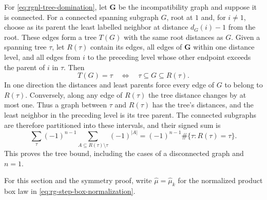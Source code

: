 \documentclass[11pt,letterpaper,reqno]{amsart}
\begin{document}
For \eqref{eq:rgnl-tree-domination}, let $\mathbf G$ be
the incompatibility graph and suppose it is connected.
For a connected spanning subgraph $G$, root at $1$ and,
for $i\ne1$, choose as its parent the least labelled
neighbor at distance $d_G(i)-1$ from the root.
These edges form a tree $T(G)$ with the same root distances
as $G$. Given a spanning tree $\tau$, let $R(\tau)$ contain
its edges, all edges of $\mathbf G$ within one distance
level, and all edges from $i$ to the preceding level whose
other endpoint exceeds the parent of $i$ in $\tau$.
Then
\[
 T(G)=\tau\quad\Longleftrightarrow\quad
                                      \tau\subseteq G\subseteq R(\tau).
\]
In one direction the distances and least parents force
every edge of $G$ to belong to $R(\tau)$.
Conversely, along any edge of $R(\tau)$ the tree distance
changes by at most one. Thus a graph between $\tau$ and
$R(\tau)$ has the tree's distances, and the least neighbor
in the preceding level is its tree parent.
The connected subgraphs are therefore partitioned into
these intervals, and their signed sum is
\[
 \sum_\tau(-1)^{n-1}
           \sum_{A\subseteq R(\tau)\setminus\tau}(-1)^{|A|}
 =(-1)^{n-1}\#\{\tau:R(\tau)=\tau\}.
\]
This proves the tree bound, including the cases
of a disconnected graph and $n=1$.

For this section and the symmetry proof, write $\widehat\mu=\widehat\mu_k$ for the normalized product box law in \eqref{eq:rg-step-box-normalization}.
\end{document}

